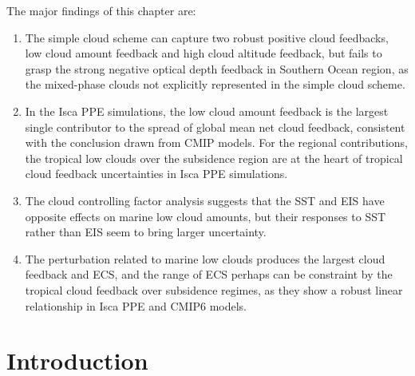 The major findings of this chapter are:
\begin{enumerate}
    \item The simple cloud scheme can capture two robust positive cloud feedbacks, low cloud amount feedback and high cloud altitude feedback, but fails to grasp the strong negative optical depth feedback in Southern Ocean region, as the mixed-phase clouds not explicitly represented in the simple cloud scheme.
    \item In the Isca PPE simulations, the low cloud amount feedback is the largest single contributor to the spread of global mean net cloud feedback, consistent with the conclusion drawn from CMIP models. For the regional contributions, the tropical low clouds over the subsidence region are at the heart of tropical cloud feedback uncertainties in Isca PPE simulations.
    \item The cloud controlling factor analysis suggests that the SST and EIS have opposite effects on marine low cloud amounts, but their responses to SST rather than EIS seem to bring larger uncertainty.
    \item The perturbation related to marine low clouds produces the largest cloud feedback and ECS, and the range of ECS perhaps can be constraint by the tropical cloud feedback over subsidence regimes, as they show a robust linear relationship in Isca PPE and CMIP6 models.
\end{enumerate}

\section{Introduction}
\label{sec:cld_fbk_chap_intro}

